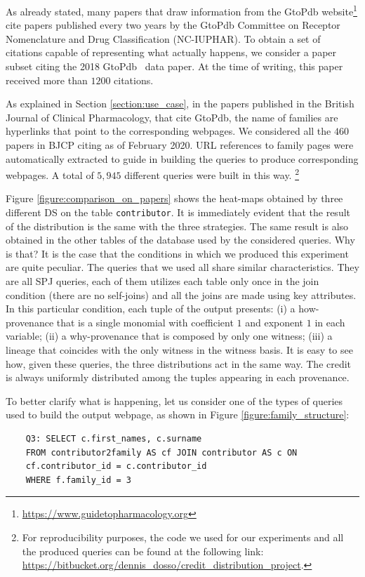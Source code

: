 As already stated, many papers that draw information from the GtoPdb website\footnote{\url{https://www.guidetopharmacology.org}} cite papers published every two years by the GtoPdb Committee on Receptor Nomenclature and Drug Classification (NC-IUPHAR).
To obtain a set of citations capable of representing what actually happens, we consider a paper subset citing the 2018 GtoPdb~\citep{iuphar2018} data paper. 
At the time of writing, this paper received more than $1200$ citations. 

As explained in Section \ref{section:use_case}, in the papers published in the British Journal of Clinical Pharmacology, that cite GtoPdb, the name of families are hyperlinks that point to the corresponding webpages.
We considered all the $460$ papers in BJCP citing \citep{iuphar2018} as of February 2020. 
URL references to family pages were automatically extracted to guide in building the queries to produce corresponding webpages.
A total of $5,945$ different queries were built in this way. \footnote{For reproducibility purposes, the code we used for our experiments and all the produced queries can be found at the following link: \url{https://bitbucket.org/dennis_dosso/credit_distribution_project}.}

Figure \ref{figure:comparison_on_papers} shows the heat-maps obtained by three different DS on the table \texttt{contributor}.
It is immediately evident that the result of the distribution is the same with the three strategies. The same result is also obtained in the other tables of the database used by the considered queries. 
Why is that? 
It is the case that the conditions in which we produced this experiment are quite peculiar. The queries that we used all share similar characteristics. They are all SPJ queries, each of them utilizes each table only once in the join condition (there are no self-joins) and all the joins are made using key attributes. 
In this particular condition, each tuple of the output presents: (i) a how-provenance that is a single monomial with coefficient $1$ and exponent $1$ in each variable; (ii) a why-provenance that is composed by only one witness; (iii) a lineage that coincides with the only witness in the witness basis.
It is easy to see how, given these queries, the three distributions act in the same way.
The credit is always uniformly distributed among the tuples appearing in each provenance. 

To better clarify what is happening, let us consider one of the types of queries used to build the output webpage, as shown in Figure \ref{figure:family_structure}:
\begin{verbatim}
	Q3: SELECT c.first_names, c.surname
	FROM contributor2family AS cf JOIN contributor AS c ON 
	cf.contributor_id = c.contributor_id 
	WHERE f.family_id = 3
\end{verbatim}

